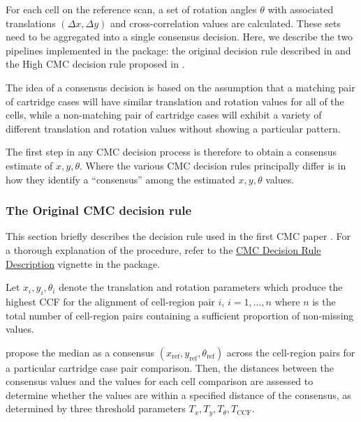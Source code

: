 For each cell on the reference scan, a set of rotation angles \(\theta\)
with associated translations \((\Delta x, \Delta y)\) and
cross-correlation values are calculated. These sets need to be
aggregated into a single consensus decision. Here, we describe the two
pipelines implemented in the  package: the original
decision rule described in \citet{song_3d_2014} and the High CMC
decision rule proposed in \citep{tong_improved_2015}.

The idea of a consensus decision is based on the assumption that a
matching pair of cartridge cases will have similar translation and
rotation values for all of the cells, while a non-matching pair of
cartridge cases will exhibit a variety of different translation and
rotation values without showing a particular pattern.

The first step in any CMC decision process is therefore to obtain a
consensus estimate of \(x, y, \theta\). Where the various CMC decision
rules principally differ is in how they identify a ``consensus'' among
the estimated \(x,y, \theta\) values.

\hypertarget{originalMethod}{%
\subsubsection{The Original CMC decision rule}\label{originalMethod}}

This section briefly describes the decision rule used in the first CMC
paper \citep{song_proposed_2013}. For a thorough explanation of the
procedure, refer to the
\href{https://csafe-isu.github.io/cmcR/articles/decisionRuleDescription.html}{CMC
Decision Rule Description} vignette in the  package.

Let \(x_i, y_i, \theta_i\) denote the translation and rotation
parameters which produce the highest CCF for the alignment of
cell-region pair \(i\), \(i = 1,...,n\) where \(n\) is the total number
of cell-region pairs containing a sufficient proportion of non-missing
values.

\citet{song_proposed_2013} propose the median as a consensus
\((x_{\text{ref}}, y_{\text{ref}}, \theta_{\text{ref}})\) across the
cell-region pairs for a particular cartridge case pair comparison. Then,
the distances between the consensus values and the values for each cell
comparison are assessed to determine whether the values are within a
specified distance of the consensus, as determined by three threshold
parameters \(T_{x}, T_{y}, T_\theta, T_{\text{CCF}}\).

